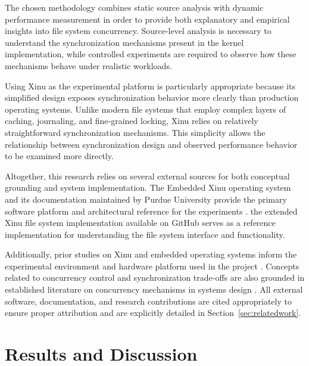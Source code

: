 \documentclass[sigconf]{acmart}
\begin{document}
The chosen methodology combines static source analysis with dynamic performance measurement in order to provide both explanatory and empirical insights into file system concurrency. Source-level analysis is necessary to understand the synchronization mechanisms present in the kernel implementation, while controlled experiments are required to observe how these mechanisms behave under realistic workloads.

Using Xinu as the experimental platform is particularly appropriate because its simplified design exposes synchronization behavior more clearly than production operating systems. Unlike modern file systems that employ complex layers of caching, journaling, and fine-grained locking, Xinu relies on relatively straightforward synchronization mechanisms. This simplicity allows the relationship between synchronization design and observed performance behavior to be examined more directly.

Altogether, this research relies on several external sources for both conceptual grounding and system implementation. The Embedded Xinu operating system and its documentation maintained by Purdue University provide the primary software platform and architectural reference for the experiments \cite{xinu_purdue2026}. the extended Xinu file system implementation available on GitHub \cite{joshi2018xinu} serves as a reference implementation for understanding the file system interface and functionality.

Additionally, prior studies on Xinu and embedded operating systems inform the experimental environment and hardware platform used in the project \cite{Biggers2014PortingTE, McGee2020UsingEX, Bansal2017XinuPi3TM}. Concepts related to concurrency control and synchronization trade-offs are also grounded in established literature on concurrency mechanisms in systems design \cite{2021ConcurrencyCA}. All external software, documentation, and research contributions are cited appropriately to ensure proper attribution and are explicitly detailed in Section~\ref{sec:relatedwork}.





\section{Results and Discussion}
\end{document}
